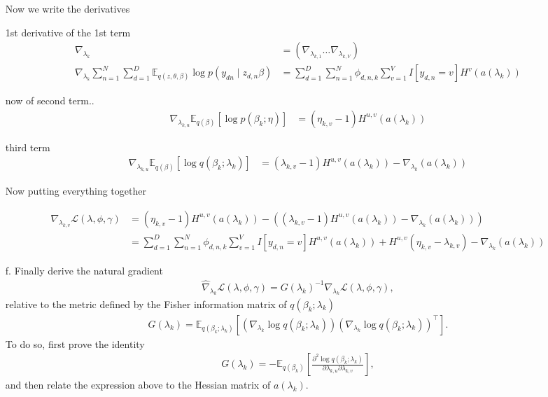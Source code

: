 \documentclass [12pt]{article}
\newcommand{\E}{\ensuremath{\mathbb{E}}}
\begin{document}
\begin{itemize}
Now we write the derivatives 

1st derivative of the 1st term
\begin{align*}
    \nabla_{\lambda_k} &= \left( \nabla_{\lambda_{k,1}} \dots \nabla_{\lambda_{k,V}} \right) \\
    \nabla_{\lambda_{k}} \sum_{n=1}^N \sum_{d=1}^D \E_{q(z, \theta, \beta)}{ \log p(y_{dn} \mid z_{d,n} \beta)} &=  \sum_{d=1}^D \sum_{n=1}^N \phi_{d,n,k} \sum_{v=1}^V I[y_{d,n} = v]  H^v(a(\lambda_k) )
\end{align*}

now of second term..
\begin{align*}
    \nabla_{\lambda_{k,u}} \E_{q(\beta)} \left[\log p(\beta_k ; \eta)\right] &= (\eta_{k,v} -1) H^{u,v} (a(\lambda_k))
\end{align*}

third term
\begin{align*}
    \nabla_{\lambda_{k,u}}  \E_{q(\beta)} \left[\log q(\beta_k ; \lambda_k)\right] &= (\lambda_{k,v} -1) H^{u,v}(a(\lambda_k)) - \nabla_{\lambda_k} (a(\lambda_k))
\end{align*}

Now putting everything together

\begin{align*}
    \nabla_{\lambda_{k,v}} \mathcal{L}(\lambda, \phi, \gamma) &= (\eta_{k,v} -1) H^{u,v} (a(\lambda_k)) - \left((\lambda_{k,v} -1) H^{u,v}(a(\lambda_k)) -  \nabla_{\lambda_k} (a(\lambda_k))  \right) \\
    &= \sum_{d=1}^D \sum_{n=1}^N \phi_{d,n,k} \sum_{v=1}^V I[y_{d,n} = v]  H^{u,v}(a(\lambda_k) ) + H^{u,v} (\eta_{k,v} -\lambda_{k,v} ) - \nabla_{\lambda_k} (a(\lambda_k))
\end{align*}
\item[f.] Finally derive the natural gradient 
\begin{align*}
	\hat{\nabla}_{\lambda_k} \mathcal{L}(\lambda, \phi, \gamma)
    =
    G(\lambda_k)^{-1}
    \nabla_{\lambda_{k}}
    \mathcal{L}(\lambda, \phi, \gamma)
    ,
\end{align*}
relative to the metric defined by the Fisher information matrix of $q(\beta_k ; \lambda_k)$
\begin{align*}
	G(\lambda_k) 
    = 
    \E_{q(\beta_k ; \lambda_k)}
    \left[
    	\left(
        	\nabla_{\lambda_k} \log q(\beta_k ; \lambda_k)
        \right)
    	\left(
        	\nabla_{\lambda_k} \log q(\beta_k ; \lambda_k)
        \right)^\top
    \right].
\end{align*}
To do so, first prove the identity
\begin{align*}
	G(\lambda_k)
    =
	-\E_{q(\beta_k)}
    \left[
    	\frac{\partial^2 \log q(\beta_k ; \lambda_k)}{\partial \lambda_{k,u} \partial \lambda_{k,v}}
    \right],
\end{align*}
and then relate the expression above to the Hessian matrix of $a(\lambda_k)$.
\end{itemize}
\end{document}
